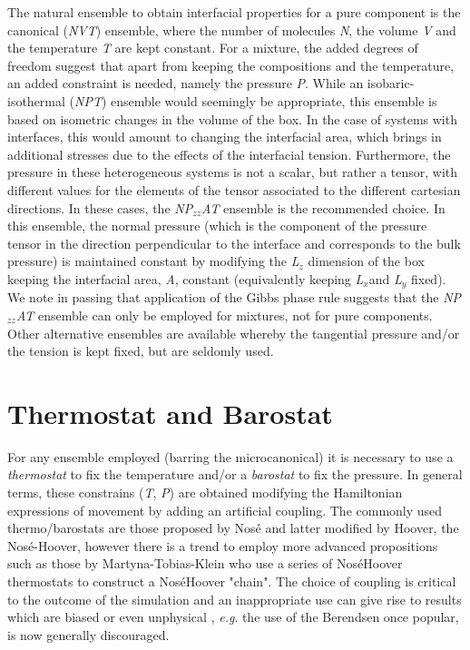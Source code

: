 \documentclass{scrbook}
\begin{document}
The natural ensemble to obtain interfacial properties for a pure component is
the canonical (\textit{NVT}) ensemble, where the number of molecules
\textit{N}, the volume \textit{V} and the temperature \textit{T} are kept
constant\textit{.} For a mixture, the added degrees of freedom suggest that
apart from keeping the compositions and the temperature, an added constraint is
needed, namely the pressure \textit{P}. While an isobaric-isothermal
(\textit{NPT}) ensemble would seemingly be appropriate, this ensemble is based
on isometric changes in the volume of the box. In the case of systems with
interfaces, this would amount to changing the interfacial area, which brings in
additional stresses due to the effects of the interfacial tension. Furthermore,
the pressure in these heterogeneous systems is not a scalar, but rather
a tensor, with different values for the elements of the tensor associated to
the different cartesian directions.  In these cases, the
\textit{NP}$_{zz}$\textit{AT} ensemble is the recommended choice. In this
ensemble, the normal pressure (which is the component of the pressure tensor in
the direction perpendicular to the interface and corresponds to the bulk
pressure) is maintained constant by modifying the \textit{L}$_{z}$ dimension of
the box keeping the interfacial area, \textit{A}, constant (equivalently
keeping \textit{L}$_{x }$and \textit{L}$_{y}$ fixed). We note in passing that
application of the Gibbs phase rule suggests that the
\textit{NP}$_{zz}$\textit{AT} ensemble can only be employed for mixtures, not
for pure components. Other alternative ensembles are available
\citep{zhang1995} whereby the tangential pressure and/or the tension
is kept fixed, but are seldomly used.  

\section{Thermostat and Barostat}
For any ensemble employed (barring the microcanonical) it is necessary to use
a \textit{thermostat} to fix the temperature and/or a \textit{barostat} to fix
the pressure. In general terms, these constrains (\textit{T}, \textit{P}) are
obtained modifying the Hamiltonian expressions of movement by adding an
artificial coupling. The commonly used thermo/barostats are those proposed by
Nos\'{e} and latter modified by Hoover, the Nos\'{e}-Hoover\citep{hoover1985},
however there is a trend to employ more advanced propositions such as
those by Martyna-Tobias-Klein \citep{martyna1992} who use a series of
Nos\'{e}\textendash{}Hoover thermostats to construct
a Nos\'{e}\textendash{}Hoover "chain".  The choice of coupling is critical to
the outcome of the simulation \citep{shirts2013}
and an inappropriate use can give rise to results which are biased
or even unphysical \citep{wong2016}, \textit{e.g}. the use of
the Berendsen \citep{berendsen1984}
once popular, is now generally discouraged.
\end{document}
